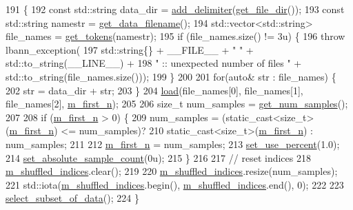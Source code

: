\begin{DoxyCode}
191                            \{
192   \textcolor{keyword}{const} std::string data\_dir = \hyperlink{namespacelbann_a1b8b05bbf2e59808a51ead80c47a9359}{add\_delimiter}(\hyperlink{classlbann_1_1generic__data__reader_ab4c6c2d4ba40ece809ce896828c8ff03}{get\_file\_dir}());
193   \textcolor{keyword}{const} std::string namestr = \hyperlink{classlbann_1_1generic__data__reader_a56664e1b43f3fe923cf6d652f14b40a9}{get\_data\_filename}();
194   std::vector<std::string> file\_names = \hyperlink{namespacelbann_af3f2c9055423e1fe3380b1ad4c4ab5ef}{get\_tokens}(namestr);
195   \textcolor{keywordflow}{if} (file\_names.size() != 3u) \{
196     \textcolor{keywordflow}{throw} lbann\_exception(
197       std::string\{\} + \_\_FILE\_\_ + \textcolor{stringliteral}{" "} + std::to\_string(\_\_LINE\_\_) +
198       \textcolor{stringliteral}{" :: unexpected number of files "} + std::to\_string(file\_names.size()));
199   \}
200 
201   \textcolor{keywordflow}{for}(\textcolor{keyword}{auto}& str : file\_names) \{
202     str = data\_dir + str;
203   \}
204   \hyperlink{classlbann_1_1data__reader__jag_a1a5c6cbbaba03f9826cbbd7657427351}{load}(file\_names[0], file\_names[1], file\_names[2], \hyperlink{classlbann_1_1generic__data__reader_a51af253029b7daea29bc46cbbef686b3}{m\_first\_n});
205 
206   \textcolor{keywordtype}{size\_t} num\_samples = \hyperlink{classlbann_1_1data__reader__jag_a321580d6f335308e19868b4c3d5c9558}{get\_num\_samples}();
207 
208   \textcolor{keywordflow}{if} (\hyperlink{classlbann_1_1generic__data__reader_a51af253029b7daea29bc46cbbef686b3}{m\_first\_n} > 0) \{
209     num\_samples = (\textcolor{keyword}{static\_cast<}\textcolor{keywordtype}{size\_t}\textcolor{keyword}{>}(\hyperlink{classlbann_1_1generic__data__reader_a51af253029b7daea29bc46cbbef686b3}{m\_first\_n}) <= num\_samples)?
210                    \textcolor{keyword}{static\_cast<}\textcolor{keywordtype}{size\_t}\textcolor{keyword}{>}(\hyperlink{classlbann_1_1generic__data__reader_a51af253029b7daea29bc46cbbef686b3}{m\_first\_n}) : num\_samples;
211 
212     \hyperlink{classlbann_1_1generic__data__reader_a51af253029b7daea29bc46cbbef686b3}{m\_first\_n} = num\_samples;
213     \hyperlink{classlbann_1_1generic__data__reader_ae6929a8bd2e59da72a8c2e537f0b2b37}{set\_use\_percent}(1.0);
214     \hyperlink{classlbann_1_1generic__data__reader_aa2d83c4ffc58534e0c193b6b9f9fb925}{set\_absolute\_sample\_count}(0u);
215   \}
216 
217   \textcolor{comment}{// reset indices}
218   \hyperlink{classlbann_1_1generic__data__reader_aaab6aeff67ffff1c689336851fec2c57}{m\_shuffled\_indices}.clear();
219 
220   \hyperlink{classlbann_1_1generic__data__reader_aaab6aeff67ffff1c689336851fec2c57}{m\_shuffled\_indices}.resize(num\_samples);
221   std::iota(\hyperlink{classlbann_1_1generic__data__reader_aaab6aeff67ffff1c689336851fec2c57}{m\_shuffled\_indices}.begin(), \hyperlink{classlbann_1_1generic__data__reader_aaab6aeff67ffff1c689336851fec2c57}{m\_shuffled\_indices}.end(), 0);
222 
223   \hyperlink{classlbann_1_1generic__data__reader_aa28fdeeb6af492540f507e49adff5d6c}{select\_subset\_of\_data}();
224 \}
\end{DoxyCode}
